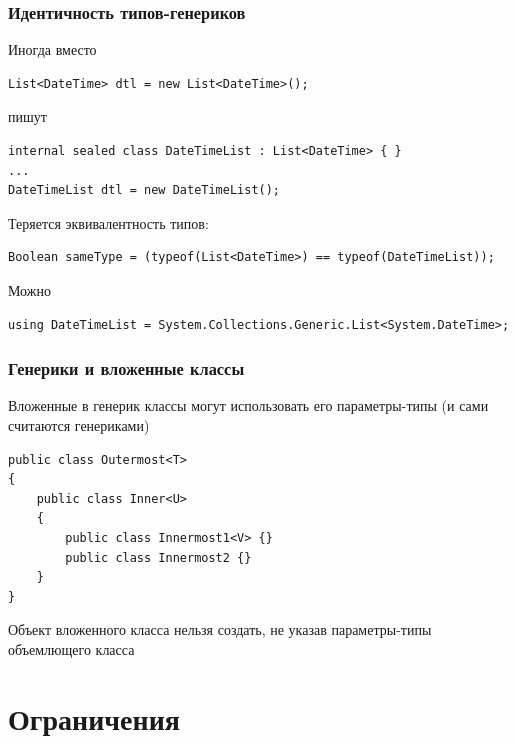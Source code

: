 \documentclass[xetex,mathserif,serif]{beamer}
\begin{document}
	\begin{frame}[fragile]
		\frametitle{Идентичность типов-генериков}
		Иногда вместо
		\begin{footnotesize}
			\begin{verbatim}
List<DateTime> dtl = new List<DateTime>();
			\end{verbatim}
		\end{footnotesize}
		пишут
		\begin{footnotesize}
			\begin{verbatim}
internal sealed class DateTimeList : List<DateTime> { }
...
DateTimeList dtl = new DateTimeList();
			\end{verbatim}
		\end{footnotesize}
		\vspace{5mm}
		Теряется эквивалентность типов:
		\begin{footnotesize}
			\begin{verbatim}
Boolean sameType = (typeof(List<DateTime>) == typeof(DateTimeList));
			\end{verbatim}
		\end{footnotesize}
		\vspace{5mm}
		Можно
		\begin{footnotesize}
			\begin{verbatim}
using DateTimeList = System.Collections.Generic.List<System.DateTime>;
			\end{verbatim}
		\end{footnotesize}
	\end{frame}

	\begin{frame}[fragile]
		\frametitle{Генерики и вложенные классы}
		Вложенные в генерик классы могут использовать его параметры-типы (и сами считаются генериками)
		\vspace{5mm}
		\begin{footnotesize}
			\begin{verbatim}
public class Outermost<T>
{
    public class Inner<U>
    {
        public class Innermost1<V> {}
        public class Innermost2 {}
    }
}
			\end{verbatim}
		\end{footnotesize}
		\vspace{5mm}
		Объект вложенного класса нельзя создать, не указав параметры-типы объемлющего класса
	\end{frame}

	\section{Ограничения}
	
\end{document}
